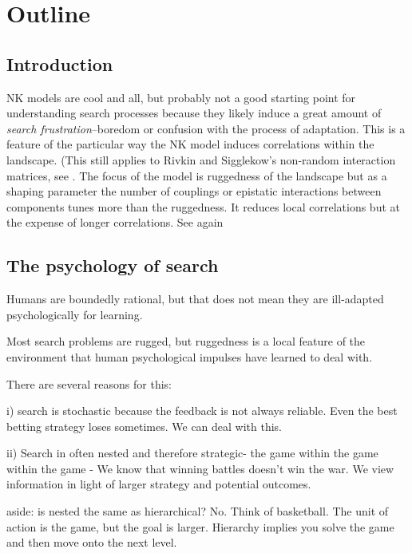\documentclass[12pt]{article}
\begin{document}
\maketitle

\section*{Outline}

\subsection{Introduction}
  NK models are cool and all, but probably not a good starting point for understanding search processes because they likely induce a great amount of \textit{search frustration}--boredom or confusion with the process of adaptation. This is a feature of the particular way the NK model induces correlations within the landscape. (This still applies to Rivkin and Sigglekow's non-random interaction matrices, see \cite{Weinberger1990}. The focus of the model is ruggedness of the landscape but as a shaping parameter the number of couplings or epistatic interactions between components tunes more than the ruggedness. It reduces local correlations but at the expense of longer correlations. See again \cite{Weinberger1990}

\subsection*{The psychology of search}
  Humans are boundedly rational, but that does not mean they are ill-adapted psychologically for learning.

  Most search problems are rugged, but ruggedness is a local feature of the environment that human psychological impulses have learned to deal with.

  There are several reasons for this:

  i) search is stochastic because the feedback is not always reliable. Even the best betting strategy loses sometimes. We can deal with this.

  ii) Search in often nested and therefore strategic- the game within the game within the game - We know that winning battles doesn't win the war. We view information in light of larger strategy and potential outcomes.

  aside: is nested the same as hierarchical? No. Think of basketball. The unit of action is the game, but the goal is larger. Hierarchy implies you solve the game and then move onto the next level.
\end{document}
